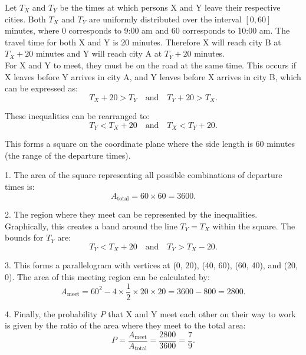 \begin{solution}
Let \( T_X \) and \( T_Y \) be the times at which persons X and Y leave their respective cities. Both \( T_X \) and \( T_Y \) are uniformly distributed over the interval \([0, 60]\) minutes, where 0 corresponds to 9:00 am and 60 corresponds to 10:00 am. The travel time for both X and Y is 20 minutes. Therefore X will reach city B at \( T_X + 20 \) minutes and Y will reach city A at \( T_Y + 20 \) minutes.\\

For X and Y to meet, they must be on the road at the same time. This occurs if X leaves before Y arrives in city A, and Y leaves before X arrives in city B, which can be expressed as:
\[
T_X + 20 > T_Y \quad \text{and} \quad T_Y + 20 > T_X.
\]

These inequalities can be rearranged to:
\[
T_Y < T_X + 20 \quad \text{and} \quad T_X < T_Y + 20.
\]

This forms a square on the coordinate plane where the side length is 60 minutes (the range of the departure times). 

\begin{center}
\end{center}

1. The area of the square representing all possible combinations of departure times is:
\[
A_{\text{total}} = 60 \times 60 = 3600.
\]

2. The region where they meet can be represented by the inequalities. Graphically, this creates a band around the line \( T_Y = T_X \) within the square. The bounds for \( T_Y \) are:
\[
T_Y < T_X + 20 \quad \text{and} \quad T_Y > T_X - 20.
\]

3. This forms a parallelogram with vertices at (0, 20), (40, 60), (60, 40), and (20, 0). The area of this meeting region can be calculated by:
\[
A_{\text{meet}} = 60^2 - 4 \times \frac{1}{2} \times 20 \times 20 = 3600 - 800 = 2800.
\]

4. Finally, the probability \( P \) that X and Y meet each other on their way to work is given by the ratio of the area where they meet to the total area:
\[
P = \frac{A_{\text{meet}}}{A_{\text{total}}} = \frac{2800}{3600} = \frac{7}{9}.
\]

\end{solution}


